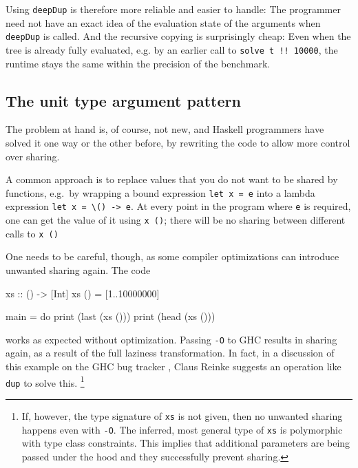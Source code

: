 \documentclass[preprint]{sigplanconf}
\theoremstyle{nonumberplain}
\newcommand{\li}{\lstinline[style=Haskell]}
\newcommand{\ci}{\lstinline[style=Cmm]}
\begin{document}
Using \li-deepDup- is therefore more reliable and easier to handle: The programmer need not have an exact idea of the evaluation state of the arguments when \li-deepDup- is called. And the recursive copying is surprisingly cheap: Even when the tree is already fully evaluated, e.g. by an earlier call to \li-solve t !! 10000-, the runtime stays the same within the precision of the benchmark.


\subsection{The unit type argument pattern}

The problem at hand is, of course, not new, and Haskell programmers have solved it one way or the other before, by rewriting the code to allow more control over sharing.

\label{sec:unit}

A common approach is to replace values that you do not want to be shared by functions, e.g.\ by wrapping a bound expression \li-let x = e- into a lambda expression \li!let x = \() -> e!. At every point in the program where \li-e- is required, one can get the value of it using \li-x ()-; there will be no sharing between different calls to \li-x ()-

One needs to be careful, though, as some compiler optimizations can introduce unwanted sharing again. The code
\begin{haskell}
xs :: () -> [Int]
xs () = [1..10000000]

main = do
    print (last (xs ()))
    print (head (xs ()))
\end{haskell}
works as expected without optimization. Passing  \ci!-O! to GHC results in sharing again, as a result of the full laziness transformation. In fact, in a discussion of this example on the GHC bug tracker \citep{spaceleakbug}, Claus Reinke suggests an operation like \li-dup- to solve this.%
\footnote{
If, however, the type signature of \li-xs- is not given, then no unwanted sharing happens even with \ci!-O!. The inferred, most general type of \li-xs- is polymorphic with type class constraints. This implies that additional parameters are being passed under the hood and they successfully prevent sharing.
}
\end{document}

